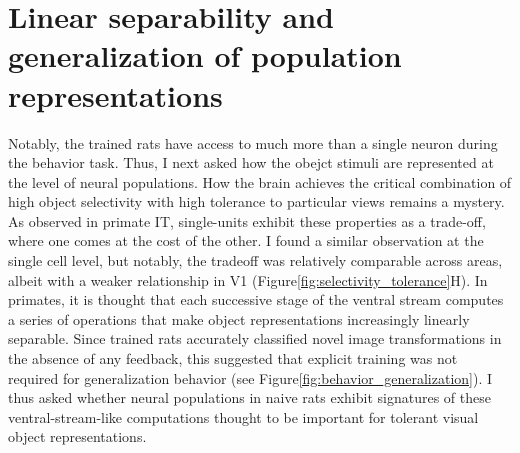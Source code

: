 \section{Linear separability and generalization of population representations}
Notably, the trained rats have access to much more than a single neuron during the behavior task. Thus, I next asked how the obejct stimuli are represented at the level of neural populations. How the brain achieves the critical combination of high object selectivity with high tolerance to particular views remains a mystery. As observed in primate IT, single-units exhibit these properties as a trade-off, where one comes at the cost of the other\cite{Zoccolan2007}. I found a similar observation at the single cell level, but notably, the tradeoff was relatively comparable across areas, albeit with a weaker relationship in V1 (Figure\ref{fig:selectivity_tolerance}H). In primates, it is thought that each successive stage of the ventral stream computes a series of operations that make object representations increasingly linearly separable. Since trained rats accurately classified novel image transformations in the absence of any feedback, this suggested that explicit training was not required for generalization behavior (see Figure\ref{fig:behavior_generalization}). I thus asked whether neural populations in naive rats exhibit signatures of these ventral-stream-like computations thought to be important for tolerant visual object representations.

